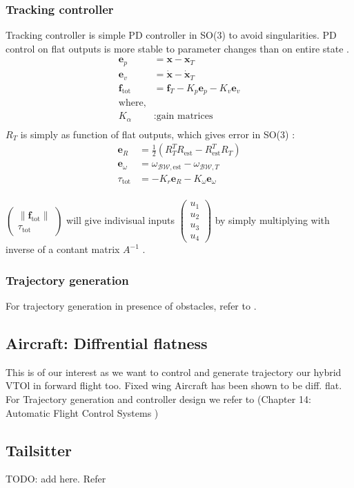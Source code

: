 \subsubsection{Tracking controller}
Tracking controller is simple PD controller in SO(3) to avoid singularities. PD control on flat outputs is more stable to parameter changes than on entire state \cite{Anintrod8:online}.
\begin{align*}
    \mathbf{e}_p &= \mathbf{x} - \mathbf{x}_T \\
    \mathbf{e}_v &= \mathbf{\dot{x}} - \mathbf{\dot{x}}_T \\
    \textbf{f}_\text{tot} &= \textbf{f}_T - K_p \mathbf{e}_p - K_v \mathbf{e}_v \\
    \text{where,} \\
    K_\alpha &: \text{gain matrices} \\
\end{align*}
$R_T$ is simply as function of flat outputs, which gives error in SO(3) \cite{bullo2004geometric}:
\begin{align*}
    \mathbf{e}_R &= \frac{1}{2} (R_T^T R_\text{est} - R_\text{est}^T R_T)\\
    \mathbf{e}_\omega &= \omega_{\mathcal{BW},\text{est}} - \omega_{\mathcal{BW},T}\\
    \tau_\text{tot} &= -K_r \mathbf{e}_R - K_\omega \mathbf{e}_\omega \\
\end{align*}

$\begin{pmatrix} \|\textbf{f}_\text{tot}\| \\ \tau_\text{tot} \end{pmatrix}$ will give indivisual inputs $\begin{pmatrix}u_1\\u_2\\u_3\\u_4\end{pmatrix}$ by simply multiplying with inverse of a contant matrix $A^{-1}$ \cite{mellinger2011minimum}.

\subsubsection{Trajectory generation}

For trajectory generation in presence of obstacles, refer to \cite{mellinger2011minimum}.

\subsection{Aircraft: Diffrential flatness}
This is of our interest as we want to control and generate trajectory our hybrid VTOl in forward flight too. Fixed wing Aircraft has been shown to be diff. flat. For Trajectory generation and controller design we refer to (Chapter 14: Automatic Flight Control Systems \cite{levine2009analysis})

\subsection{Tailsitter}
TODO: add here. Refer \cite{ritz2017global}
